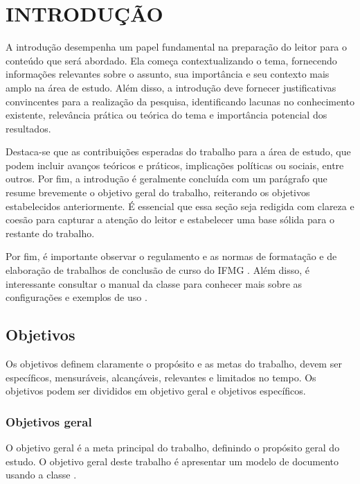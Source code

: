 \documentclass{iftex2024}
\begin{document}
\maketitle

\chapter{INTRODUÇÃO}

A introdução desempenha um papel fundamental na preparação do leitor para o conteúdo que será abordado.
Ela começa contextualizando o tema, fornecendo informações relevantes sobre o assunto, sua importância e seu contexto mais amplo na área de estudo.
Além disso, a introdução deve fornecer justificativas convincentes para a realização da pesquisa, identificando lacunas no conhecimento existente, relevância prática ou teórica do tema e importância potencial dos resultados.

Destaca-se que as contribuições esperadas do trabalho para a área de estudo, que podem incluir avanços teóricos e práticos, implicações políticas ou sociais, entre outros.
Por fim, a introdução é geralmente concluída com um parágrafo que resume brevemente o objetivo geral do trabalho, reiterando os objetivos estabelecidos anteriormente.
É essencial que essa seção seja redigida com clareza e coesão para capturar a atenção do leitor e estabelecer uma base sólida para o restante do trabalho.

Por fim, é importante observar o regulamento e as normas de formatação e de elaboração de trabalhos de conclusão de curso do IFMG \cite{ifmg:2020:manual,ifmg:2021:tcc}.
Além disso, é interessante consultar o manual da classe \iftex para conhecer mais sobre as configurações e exemplos de uso \cite{ribeiro:2024:iftex}.

\section{Objetivos}

Os objetivos definem claramente o propósito e as metas do trabalho, devem ser específicos, mensuráveis, alcançáveis, relevantes e limitados no tempo.
Os objetivos podem ser divididos em objetivo geral e objetivos específicos.

\subsection{Objetivos geral}

O objetivo geral é a meta principal do trabalho, definindo o propósito geral do estudo.
O objetivo geral deste trabalho é apresentar um modelo de documento usando a classe \iftex.
\end{document}
